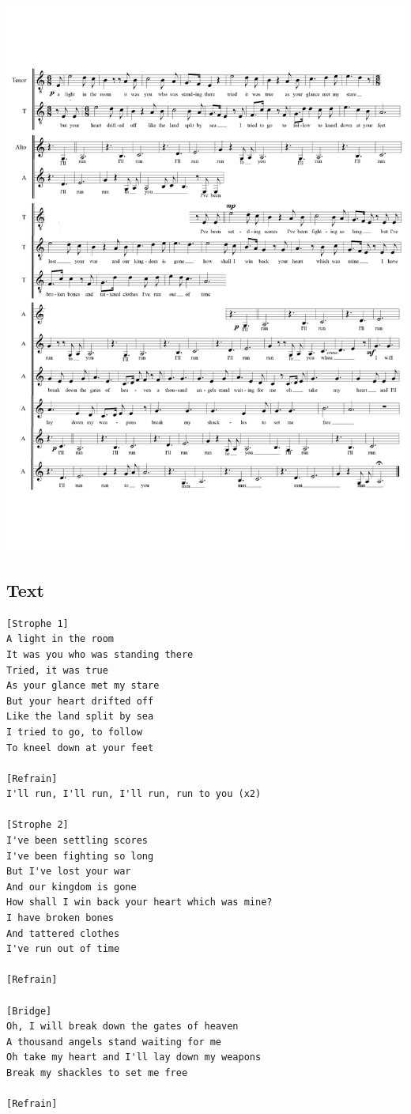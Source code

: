 \includegraphics[width=\textwidth]{resources/arrangements/Run To You - Melody.png}
\label{appendix:Run To You}

\subsection*{Text}

\begin{small}
\begin{verbatim}
[Strophe 1]
A light in the room
It was you who was standing there
Tried, it was true
As your glance met my stare
But your heart drifted off
Like the land split by sea
I tried to go, to follow  
To kneel down at your feet

[Refrain]
I'll run, I'll run, I'll run, run to you (x2)

[Strophe 2]
I've been settling scores
I've been fighting so long
But I've lost your war
And our kingdom is gone
How shall I win back your heart which was mine?
I have broken bones 
And tattered clothes
I've run out of time

[Refrain]

[Bridge]
Oh, I will break down the gates of heaven
A thousand angels stand waiting for me
Oh take my heart and I'll lay down my weapons
Break my shackles to set me free

[Refrain]
\end{verbatim}
\end{small}


